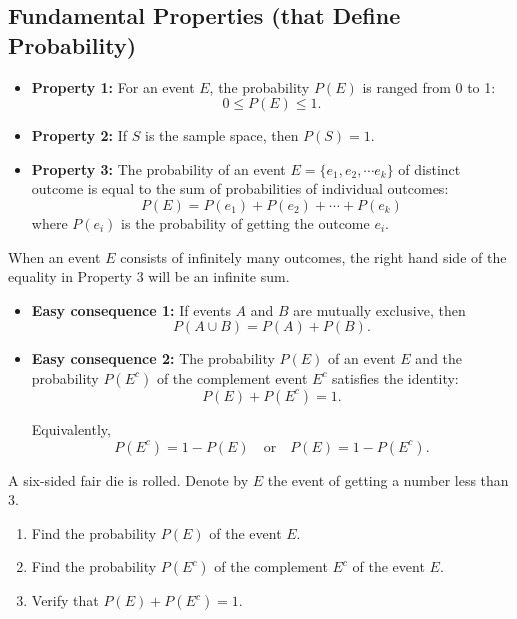 \hypertarget{fundamental-properties-that-define-probability}{%
\subsection{Fundamental Properties (that Define
Probability)}\label{fundamental-properties-that-define-probability}}

\begin{itemize}
\item
  \textbf{Property 1:} For an event \(E\), the probability \(P(E)\) is
  ranged from 0 to 1: \[0\leq P(E)\leq 1.\]
\item
  \textbf{Property 2:} If \(S\) is the sample space, then \(P(S)=1\).
\item
  \textbf{Property 3:} The probability of an event
  \(E=\{e_1,e_2, \cdots e_k\}\) of distinct outcome is equal to the sum
  of probabilities of individual outcomes:
  \[P(E)=P(e_1)+P(e_2)+\cdots+P(e_k)\] where \(P(e_i)\) is the
  probability of getting the outcome \(e_i\).
\end{itemize}

\begin{remark}

When an event \(E\) consists of infinitely many outcomes, the right hand
side of the equality in Property 3 will be an infinite sum.

\end{remark}


\begin{itemize}
\item
  \textbf{Easy consequence 1:} If events \(A\) and \(B\) are mutually
  exclusive, then \[P(A\cup B)=P(A)+P(B).\]
\item
  \textbf{Easy consequence 2:} The probability \(P(E)\) of an event
  \(E\) and the probability \(P(E^c)\) of the complement event \(E^c\)
  satisfies the identity: \[P(E)+P(E^c)=1.\]

  Equivalently, \[
  P(E^c)=1-P(E)\quad\text{or}\quad P(E)=1-P(E^c).
  \]
\end{itemize}

\begin{example}

A six-sided fair die is rolled. Denote by \(E\) the event of getting a
number less than \(3\).

\begin{enumerate}
\item
  Find the probability \(P(E)\) of the event \(E\).
\item
  Find the probability \(P(E^c)\) of the complement \(E^c\) of the event
  \(E\).
\item
  Verify that \(P(E)+P(E^c)=1\).
\end{enumerate}

\end{example}

